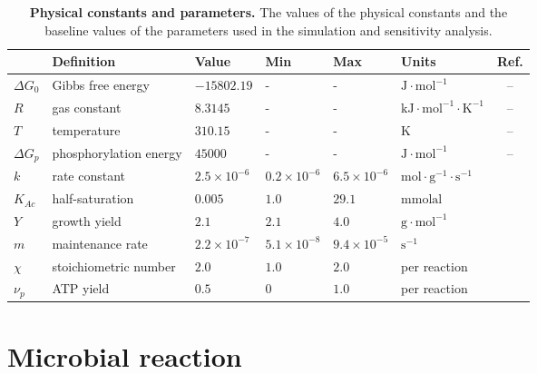 \documentclass[a4paper, 12pt]{article}
\begin{document}
\begin{table}[t]
{\footnotesize
\centering
\begin{tabular}{l|l|l|l|l|l|c}
{\bf }				& {\bf Definition}				&{\bf Value}  			&{\bf Min}  			&{\bf Max}      			&{\bf Units}							&{\bf Ref.}\\ \hline
$\Delta G_0$				&Gibbs free energy				&$-15802.19$			&-					&-					&$\mathrm{J\cdot mol^{-1}}$				&--\\  
$R$						&gas constant					&$8.3145$			&-					&-					&$\mathrm{kJ\!\cdot\!mol^{-1}\!\cdot\!K^{-1}}$	&--\\ 
$T$						&temperature					&$310.15$			&-					&-					&$\mathrm{K}$							&--\\  
$\Delta G_p$				&phosphorylation energy			&$45000$				&-					&-					&$\mathrm{J\cdot mol^{-1}}$				&--\\ \hline
$k$						&rate constant					&$2.5\!\times\!10^{-6}$	&$0.2\!\times\!10^{-6}$	&$6.5\!\times\!10^{-6}$	&$\mathrm{mol\!\cdot\! g^{-1}\!\cdot\! s^{-1}}$	&\cite{Smith1978}\\ 
$K_{Ac}$					&half-saturation					&$0.005$				&$1.0$				&$29.1$				&$\mathrm{mmolal}$						&\cite{Smith1978}\\ 
$Y$						&growth yield					&$2.1$				&$2.1$				&$4.0$				&$\mathrm{g\cdot mol^{-1}}$				&\cite{Smith1978}\\ 
$m$						&maintenance rate				&$2.2\!\times\!10^{-7}$	&$5.1\!\times\!10^{-8}$	&$9.4\!\times\!10^{-5}$	&$\mathrm{s^{-1}}$						&\cite{Lawrence1969}\\ 
$\chi$					&stoichiometric number			&$2.0$				&$1.0$				&$2.0$				&per reaction							&\cite{Jin2012}\\ 
$\nu_p$					&ATP yield					&$0.5$				&$0$					&$1.0$				&per reaction							&\cite{Jin2012}\\ \hline
\end{tabular}
\caption{{\bf Physical constants and parameters.} The values of the physical constants and the baseline values of the parameters used in the simulation and sensitivity analysis.}
\label{Tab:param}
}
\end{table}

\section{Microbial reaction}\label{Sec:model}
\end{document}
